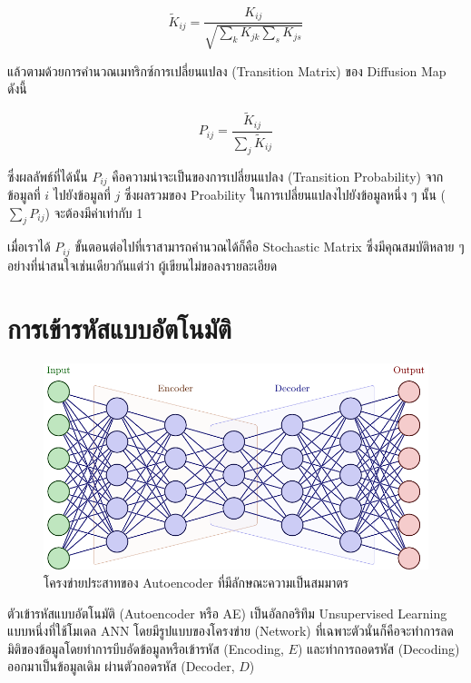 \begin{equation}
    \tilde{K}_{ij} = \frac{K_{ij}}{\sqrt{\sum_{k}K_{jk} \sum_{s}K_{js}}}
\end{equation}

\noindent แล้วตามด้วยการคำนวณเมทริกซ์การเปลี่ยนแปลง (Transition Matrix) ของ Diffusion Map ดังนี้

\begin{equation}
    P_{ij} = \frac{\tilde{K}_{ij}}{\sum_{j}\tilde{K}_{ij}}
\end{equation}

\noindent ซึ่งผลลัพธ์ที่ได้นั้น $P_{ij}$ คือความน่าจะเป็นของการเปลี่ยนแปลง (Transition Probability) จากข้อมูลที่ $i$ ไปยังข้อมูลที่ 
$j$ ซึ่งผลรวมของ Proability ในการเปลี่ยนแปลงไปยังข้อมูลหนึ่ง ๆ นั้น ($\sum_{j}P_{ij}$) จะต้องมีค่าเท่ากับ 1 

เมื่อเราได้ $P_{ij}$ ขั้นตอนต่อไปที่เราสามารถคำนวณได้ก็คือ Stochastic Matrix ซึ่งมีคุณสมบัติหลาย ๆ อย่างที่น่าสนใจเช่นเดียวกันแต่ว่า%
ผู้เขียนไม่ขอลงรายละเอียด 

\section{การเข้ารหัสแบบอัตโนมัติ}
\label{sec:autoencoder}

\begin{figure}[htbp]
    \centering
    \includegraphics[width=\linewidth]{fig/autoencoder.pdf}
    \caption{โครงข่ายประสาทของ Autoencoder ที่มีลักษณะความเป็นสมมาตร}
    \label{fig:autoencoder}
\end{figure}

ตัวเข้ารหัสแบบอัตโนมัติ (Autoencoder หรือ AE)\autocite{kramer1991} เป็นอัลกอริทึม Unsupervised Learning แบบหนึ่งที่ใช้โมเดล 
ANN โดยมีรูปแบบของโครงข่าย (Network) ที่เฉพาะตัวนั่นก็คือจะทำการลดมิติของข้อมูลโดยทำการบีบอัดข้อมูลหรือเข้ารหัส (Encoding, $E$) 
และทำการถอดรหัส (Decoding) ออกมาเป็นข้อมูลเดิม\autocite{ballard1987} ผ่านตัวถอดรหัส (Decoder, $D$) 

